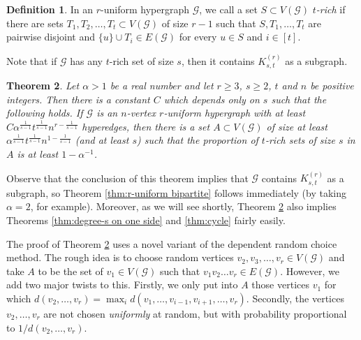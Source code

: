 \documentclass[a4paper,11pt]{article}
\newtheorem{theorem}{\bf Theorem}[section]
\theoremstyle{definition}
\newtheorem{definition}[theorem]{\bf Definition}
\def\cG{\mathcal{G}}
\begin{document}
\begin{definition}
    In an $r$-uniform hypergraph $\cG$, we call a set $S\subset V(\cG)$ \emph{$t$-rich} if there are sets $T_1,T_2,\dots,T_t\subset V(\cG)$ of size $r-1$ such that $S,T_1,\dots,T_t$ are pairwise disjoint and $\{u\}\cup T_i\in E(\cG)$ for every $u\in S$ and $i\in [t]$.
\end{definition}

Note that if $\cG$ has any $t$-rich set of size $s$, then it contains $K_{s,t}^{(r)}$ as a subgraph.

\begin{theorem} \label{thm:dependent random choice}
    Let $\alpha>1$ be a real number and let $r\geq 3$, $s\geq 2$, $t$ and $n$ be positive integers. Then there is a constant $C$ which depends only on $s$ such that the following holds. If $\cG$ is an $n$-vertex $r$-uniform hypergraph with at least $C\alpha^{\frac{1}{s-1}}t^{\frac{1}{s-1}}n^{r-\frac{1}{s-1}}$ hyperedges, then there is a set $A\subset V(\cG)$ of size at least $\alpha^{\frac{1}{s-1}}t^{\frac{1}{s-1}}n^{1-\frac{1}{s-1}}$ (and at least $s$) such that the proportion of $t$-rich sets of size $s$ in $A$ is at least $1-\alpha^{-1}$.
\end{theorem}

Observe that the conclusion of this theorem implies that $\cG$ contains $K_{s,t}^{(r)}$ as a subgraph, so Theorem \ref{thm:r-uniform bipartite} follows immediately (by taking $\alpha=2$, for example). Moreover, as we will see shortly, Theorem \ref{thm:dependent random choice} also implies Theorems \ref{thm:degree-s on one side} and \ref{thm:cycle} fairly easily. 

The proof of Theorem \ref{thm:dependent random choice} uses a novel variant of the dependent random choice method. The rough idea is to choose random vertices $v_2,v_3,\dots,v_r\in V(\cG)$ and take $A$ to be the set of $v_1\in V(\cG)$ such that $v_1v_2\dots v_r\in E(\cG)$. However, we add two major twists to this. Firstly, we only put into $A$ those vertices $v_1$ for which $d(v_2,\dots,v_r)=\max_i d(v_1,\dots,v_{i-1},v_{i+1},\dots,v_r)$. Secondly, the vertices $v_2,\dots,v_r$ are not chosen \emph{uniformly} at random, but with probability proportional to $1/d(v_2,\dots,v_r)$.
\end{document}
